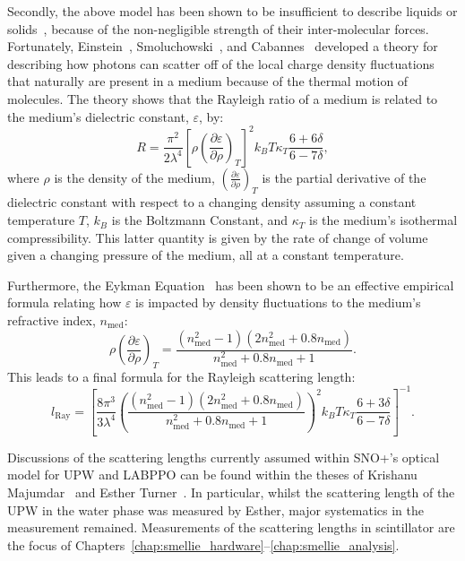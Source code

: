 Secondly, the above model has been shown to be insufficient to describe liquids or solids~\cite{}, %
because of the non-negligible strength of their inter-molecular forces. Fortunately, Einstein~\cite{}, %
Smoluchowski~\cite{}, %
and Cabannes~\cite{} %
developed a theory for describing how photons can scatter off of the local charge density fluctuations that naturally are present in a medium because of the thermal motion of molecules. The theory shows that the Rayleigh ratio of a medium is related to the medium's dielectric constant, $\varepsilon$, by:
\begin{equation}
    R = \frac{\pi^{2}}{2\lambda^{4}}\left[\rho\left(\frac{\partial\varepsilon}{\partial\rho}\right)_{T}\right]^{2} k_{B}T \kappa_{T}\frac{6+6\delta}{6-7\delta},
\end{equation}
where $\rho$ is the density of the medium, $\left(\frac{\partial\varepsilon}{\partial\rho}\right)_{T}$ is the partial derivative of the dielectric constant with respect to a changing density assuming a constant temperature $T$, $k_{B}$ is the Boltzmann Constant, and $\kappa_{T}$ is the medium's isothermal compressibility. This latter quantity is given by the rate of change of volume given a changing pressure of the medium, all at a constant temperature.

Furthermore, the Eykman Equation~\cite{} %
has been shown to be an effective empirical formula relating how $\varepsilon$ is impacted by density fluctuations to the medium's refractive index, $n_{\textrm{med}}$:
\begin{equation}
    \rho\left(\frac{\partial\varepsilon}{\partial\rho}\right)_{T} = 
    \frac{\left(n_{\textrm{med}}^{2}-1\right)\left(2n_{\textrm{med}}^{2}+0.8n_{\textrm{med}}\right)}{n_{\textrm{med}}^{2}+0.8n_{\textrm{med}}+1}.
\end{equation}
This leads to a final formula for the Rayleigh scattering length:
\begin{equation}
    l_{\mathrm{Ray}} = \left[
        \frac{8\pi^{3}}{3\lambda^{4}}
        \left(
            \frac{\left(n_{\textrm{med}}^{2}-1\right)\left(2n_{\textrm{med}}^{2}+0.8n_{\textrm{med}}\right)}{n_{\textrm{med}}^{2}+0.8n_{\textrm{med}}+1}
        \right)^2
        k_{B}T \kappa_{T}\frac{6+3\delta}{6-7\delta}
        \right]^{-1}.
\end{equation}

Discussions of the scattering lengths currently assumed within SNO+'s optical model for UPW and LABPPO can be found within the theses of Krishanu Majumdar~\cite{majumdarMeasurementOpticalScattering2015} and Esther Turner~\cite{turnerMeasurementScatteringCharacteristics2022}. In particular, whilst the scattering length of the UPW in the water phase was measured by Esther, major systematics in the measurement remained. Measurements of the scattering lengths in scintillator are the focus of Chapters~\ref{chap:smellie_hardware}--\ref{chap:smellie_analysis}.



